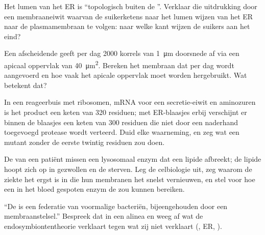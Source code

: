 \begin{exercise}[$\star\star$]\label{exo:b1:eukaryotic-cell:8}
Het lumen van het ER is ``topologisch buiten de ''. Verklaar die uitdrukking
door een membraaneiwit waarvan de suikerketens naar het lumen wijzen van het ER
naar de plasmamembraan te volgen: naar welke kant wijzen de suikers aan het eind?
\end{exercise}

\begin{exercise}[$\star\star$]\label{exo:b1:eukaryotic-cell:9}
Een afscheidende  geeft per dag \qty{2000}{} korrels van \qty{1}{\micro m}
doorsnede af via een apicaal oppervlak van \qty{40}{\micro m^2}. Bereken het
membraan dat per dag wordt aangevoerd en hoe vaak het apicale oppervlak moet
worden hergebruikt. Wat betekent dat?
\end{exercise}

\begin{exercise}[$\star\star\star$]\label{exo:b1:eukaryotic-cell:10}
In een reageerbuis met ribosomen, mRNA voor een secretie-eiwit en aminozuren is
het product een keten van \qty{320}{} residuen; met ER-blaasjes erbij verschijnt
er binnen de blaasjes een keten van \qty{300}{} residuen die niet door een
naderhand toegevoegd protease wordt verteerd. Duid elke waarneming, en zeg wat
een mutant zonder de eerste twintig residuen zou doen.
\end{exercise}

\begin{exercise}[$\star\star\star$]\label{exo:b1:eukaryotic-cell:11}
De  van een patiënt missen een lysosomaal enzym dat een lipide afbreekt;
de lipide hoopt zich op in gezwollen  en de  sterven. Leg de
celbiologie uit, zeg waarom de ziekte het ergst is in  die hun membranen
het snelst vernieuwen, en stel voor hoe een in het bloed gespoten enzym de
 zou kunnen bereiken.
\end{exercise}

\begin{exercise}[$\star\star\star$]\label{exo:b1:eukaryotic-cell:12}
``De  is een federatie van voormalige bacteriën, bijeengehouden door
een membraanstelsel.'' Bespreek dat in een alinea en weeg af wat de
endosymbiontentheorie verklaart tegen wat zij niet verklaart (, ER,
).
\end{exercise}

